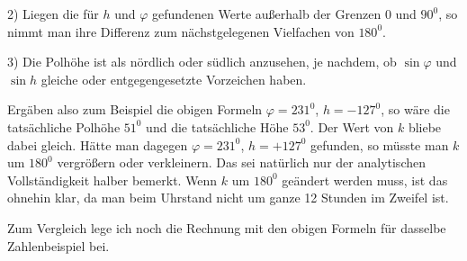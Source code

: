 2) Liegen die für $h$ und $\varphi$ gefundenen Werte außerhalb der Grenzen $0$ und $90^0$, so nimmt man ihre Differenz zum nächstgelegenen Vielfachen von $180^0$.

3) Die Polhöhe ist als nördlich oder südlich anzusehen, je nachdem, ob $\sin\varphi$ und $\sin h$ gleiche oder entgegengesetzte Vorzeichen haben.

Ergäben also zum Beispiel die obigen Formeln $\varphi=231^0$, $h=-127^0$, so wäre die tatsächliche Polhöhe $51^0$ und die tatsächliche Höhe $53^0$. Der Wert von $k$ bliebe dabei gleich. Hätte man dagegen $\varphi=231^0$, $h=+127^0$ gefunden, so müsste man $k$ um $180^0$ vergrößern oder verkleinern. Das sei natürlich nur der analytischen Vollständigkeit halber bemerkt. Wenn $k$ um $180^0$ geändert werden muss, ist das ohnehin klar, da man beim Uhrstand nicht um ganze 12 Stunden im Zweifel ist.

Zum Vergleich lege ich noch die Rechnung mit den obigen Formeln für dasselbe Zahlenbeispiel bei.

